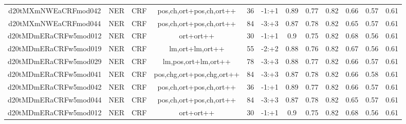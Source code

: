 \documentclass[a4paper]{article}
\begin{document}
\begin{landscape}
\begin{center}
\begin{tabular}{ |c|c|c|c|c|c|c|c|c|c|c|c|}
 	
 
 	
 		
 		\small{ d20tMXmNWEaCRFmod042 } & NER & CRF & pos,ch,ort+pos,ch,ort++  &  36 &  -1:+1  &  0.89 & 0.77 & 0.82  &  0.66 & 0.57 & 0.61 \\
 		

 	
 
 	
 		
 		\small{ d20tMXmNWEaCRFmod044 } & NER & CRF & pos,ch,ort+pos,ch,ort++  &  84 &  -3:+3  &  0.87 & 0.78 & 0.82  &  0.65 & 0.57 & 0.61 \\
 		

 	
 
 	
 		
 		\small{ d20tMDmERaCRFw5mod012 } & NER & CRF & ort+ort++  &  30 &  -1:+1  &  0.9 & 0.75 & 0.82  &  0.68 & 0.56 & 0.61 \\
 		

 	
 
 	
 		
 		\small{ d20tMDmERaCRFw5mod019 } & NER & CRF & lm,ort+lm,ort++  &  55 &  -2:+2  &  0.88 & 0.76 & 0.82  &  0.67 & 0.56 & 0.61 \\
 		

 	
 
 	
 		
 		\small{ d20tMDmERaCRFw5mod029 } & NER & CRF & lm,pos,ort+lm,ort++  &  78 &  -3:+3  &  0.88 & 0.77 & 0.82  &  0.66 & 0.57 & 0.61 \\
 		

 	
 
 	
 		
 		\small{ d20tMDmERaCRFw5mod041 } & NER & CRF & pos,chg,ort+pos,chg,ort++  &  84 &  -3:+3  &  0.87 & 0.78 & 0.82  &  0.66 & 0.58 & 0.61 \\
 		

 	
 
 	
 		
 		\small{ d20tMDmERaCRFw5mod042 } & NER & CRF & pos,ch,ort+pos,ch,ort++  &  36 &  -1:+1  &  0.89 & 0.77 & 0.82  &  0.66 & 0.57 & 0.61 \\
 		

 	
 
 	
 		
 		\small{ d20tMDmERaCRFw5mod044 } & NER & CRF & pos,ch,ort+pos,ch,ort++  &  84 &  -3:+3  &  0.87 & 0.78 & 0.82  &  0.65 & 0.57 & 0.61 \\
 		

 	
 
 	
 		
 		\small{ d20tMDmERaCRFw5mod012 } & NER & CRF & ort+ort++  &  30 &  -1:+1  &  0.9 & 0.75 & 0.82  &  0.68 & 0.56 & 0.61 \\
 		


\end{tabular}
\end{center}
\end{landscape}
\end{document}
